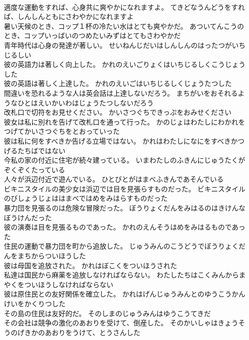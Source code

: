 \documentclass[8pt]{extreport}
\begin{document}
\begin{CJK}{UTF8}{min}
\\	適度な運動をすれば、心身共に爽やかになれますよ。	てきどなうんどうをすれば、しんしんともにさわやかになれますよ 
\\	暑い天候のとき、コップ１杯の冷たい水はとても爽やかだ。	あついてんこうのとき、コップいっばいのつめたいみずはとてもさわやかだ 
\\	青年時代は心身の発達が著しい。	せいねんじだいはしんしんのはったつがいちじるしい 
\\	彼の英語力は著しく向上した。	かれのえいごりょくはいちじるしくこうじょうした 
\\	彼の英語は著しく上達した。	かれのえいごはいちじるしくじょうたつした 
\\	間違いを恐れるような人は英会話は上達しないだろう。	まちがいをおそれるようなひとはえいかいわはじょうたつしないだろう 
\\	改札口で切符をお見せください。	かいさつぐちできっぷをおみせください 
\\	彼女は私に別れを告げて改札口を通って行った。	かのじょはわたしにわかれをつげてかいさつぐちをとおっていった 
\\	彼は私に何をすべきか告げる立場ではない。	かれはわたしになにをすべきかつげるたちばではない 
\\	今私の家の付近に住宅が続々建っている。	いまわたしのふきんにじゅうたくがぞくぞくたっている 
\\	人々が浜辺付近で遊んでいる。	ひとびとがはまべふきんであそんでいる 
\\	ビキニスタイルの美少女は浜辺では目を見張らすものだった。	ビキニスタイルのびしょうじょははまべではめをみはらすものだった 
\\	暴力団を見張るのは危険な冒険だった。	ぼうりょくだんをみはるのはきけんなぼうけんだった 
\\	彼の演奏は目を見張るものであった。	かれのえんそうはめをみはるものであった 
\\	住民の運動で暴力団を町から追放した。	じゅうみんのこうどうでぼうりょくだんをまちからついほうした 
\\	彼は母国を追放された。	かれはぼこくをついほうされた 
\\	私達は国民から麻薬を追放しなければならない。	わたしたちはこくみんからまやくをついほうしなければならない 
\\	彼は原住民との友好関係を確立した。	かれはげんじゅうみんとのゆうこうかんけいをかくりつした 
\\	その島の住民は友好的だ。	そのしまのじゅうみんはゆうこうてきだ 
\\	その会社は競争の激化のあおりを受けて、倒産した。	そのかいしゃはきょうそうのげきかのあおりをうけて、とうさんした 

\end{CJK}
\end{document}

